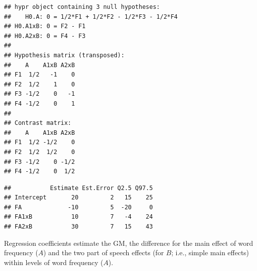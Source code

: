 \documentclass[12pt,]{krantz}
\newenvironment{Shaded}{\begin{snugshade}}{\end{snugshade}}
\newcommand{\DataTypeTok}[1]{\textcolor[rgb]{0.13,0.29,0.53}{#1}}
\newcommand{\DecValTok}[1]{\textcolor[rgb]{0.00,0.00,0.81}{#1}}
\newcommand{\KeywordTok}[1]{\textcolor[rgb]{0.13,0.29,0.53}{\textbf{#1}}}
\newcommand{\NormalTok}[1]{#1}
\newcommand{\OperatorTok}[1]{\textcolor[rgb]{0.81,0.36,0.00}{\textbf{#1}}}
\newcommand{\StringTok}[1]{\textcolor[rgb]{0.31,0.60,0.02}{#1}}
\theoremstyle{definition}
\theoremstyle{definition}
\theoremstyle{definition}
\theoremstyle{remark}
\begin{document}
\begin{verbatim}
## hypr object containing 3 null hypotheses:
##    H0.A: 0 = 1/2*F1 + 1/2*F2 - 1/2*F3 - 1/2*F4
## H0.A1xB: 0 = F2 - F1
## H0.A2xB: 0 = F4 - F3
## 
## Hypothesis matrix (transposed):
##    A    A1xB A2xB
## F1  1/2   -1    0
## F2  1/2    1    0
## F3 -1/2    0   -1
## F4 -1/2    0    1
## 
## Contrast matrix:
##    A    A1xB A2xB
## F1  1/2 -1/2    0
## F2  1/2  1/2    0
## F3 -1/2    0 -1/2
## F4 -1/2    0  1/2
\end{verbatim}

\begin{Shaded}
\end{Shaded}

\begin{verbatim}
##           Estimate Est.Error Q2.5 Q97.5
## Intercept       20         2   15    25
## FA             -10         5  -20     0
## FA1xB           10         7   -4    24
## FA2xB           30         7   15    43
\end{verbatim}

Regression coefficients estimate the GM, the difference for the main effect of word frequency (\(A\)) and the two part of speech effects (for \(B\); i.e., simple main effects) within levels of word frequency (\(A\)).
\end{document}
